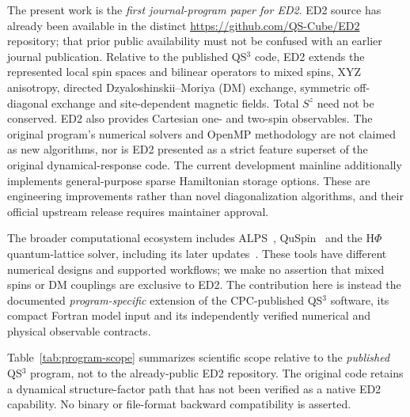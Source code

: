 \documentclass[preprint,12pt,nopreprintline]{elsarticle}
\newcommand{\QSthree}{QS$^{3}$}
\begin{document}
The present work is the \emph{first journal-program paper for ED2}.
ED2 source has already been available in the distinct
\url{https://github.com/QS-Cube/ED2} repository; that prior public
availability must not be confused with an earlier journal publication.
Relative to the published \QSthree{} code, ED2 extends the represented
local spin spaces and bilinear operators to mixed spins, XYZ anisotropy,
directed Dzyaloshinskii--Moriya (DM) exchange, symmetric off-diagonal
exchange and site-dependent magnetic fields. Total $S^z$ need not be
conserved. ED2 also provides Cartesian one- and two-spin observables.
The original program's numerical solvers and OpenMP methodology
are not claimed as new algorithms, nor is ED2 presented as a strict
feature superset of the original dynamical-response code.
The current development mainline additionally implements
general-purpose sparse Hamiltonian storage options. These are
engineering improvements rather than novel diagonalization algorithms,
and their official upstream release requires maintainer approval.

The broader computational ecosystem includes ALPS~\cite{bauer2011},
QuSpin~\cite{weinberg2017} and the H$\Phi$ quantum-lattice solver,
including its later updates~\cite{kawamura2017,ido2024}.
These tools have different numerical designs and supported workflows;
we make no assertion that mixed spins or DM couplings are exclusive
to ED2. The contribution here is instead the documented
\emph{program-specific} extension of the CPC-published QS$^3$
software, its compact Fortran model input and its independently
verified numerical and physical observable contracts.


Table~\ref{tab:program-scope} summarizes scientific scope relative
to the \emph{published} \QSthree{} program, not to the already-public
ED2 repository. The original code retains a dynamical structure-factor
path that has not been verified as a native ED2 capability.
No binary or file-format backward compatibility is asserted.
\end{document}
